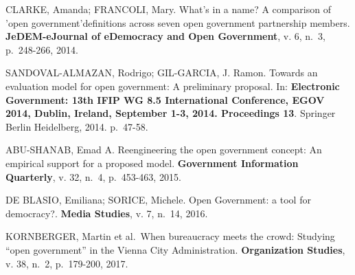 \documentclass{article}
\begin{document}
CLARKE, Amanda; FRANCOLI, Mary. What's in a name? A comparison of 'open
government'definitions across seven open government partnership members.
\textbf{JeDEM-eJournal of eDemocracy and Open Government}, v. 6, n.~3,
p.~248-266, 2014.

SANDOVAL-ALMAZAN, Rodrigo; GIL-GARCIA, J. Ramon. Towards an evaluation
model for open government: A preliminary proposal. In:
\textbf{Electronic Government: 13th IFIP WG 8.5 International
Conference, EGOV 2014, Dublin, Ireland, September 1-3, 2014. Proceedings
13}. Springer Berlin Heidelberg, 2014. p.~47-58.

ABU-SHANAB, Emad A. Reengineering the open government concept: An
empirical support for a proposed model. \textbf{Government Information
Quarterly}, v. 32, n.~4, p.~453-463, 2015.

DE BLASIO, Emiliana; SORICE, Michele. Open Government: a tool for
democracy?. \textbf{Media Studies}, v. 7, n.~14, 2016.

KORNBERGER, Martin et al.~When bureaucracy meets the crowd: Studying
``open government'' in the Vienna City Administration.
\textbf{Organization Studies}, v. 38, n.~2, p.~179-200, 2017.



\end{document}
